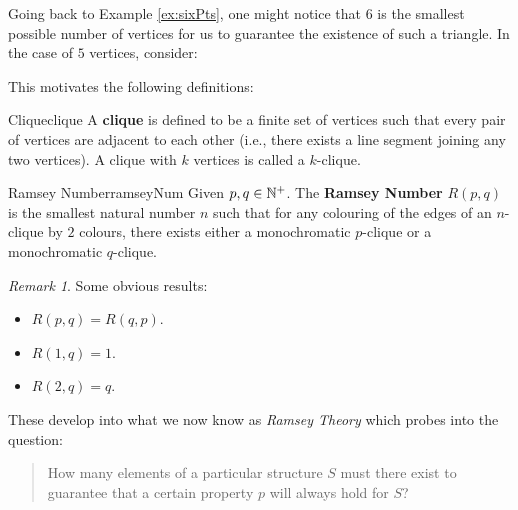 \documentclass[math]{amznotes}
\theoremstyle{remark}
\newtheorem*{remark}{Remark}
\begin{document}
Going back to Example \ref{ex:sixPts}, one might notice that $6$ is the smallest possible number of vertices for us to guarantee the existence of such a triangle. In the case of $5$ vertices, consider:
\begin{center}
\end{center}
This motivates the following definitions:
\begin{dfnbox}{Clique}{clique}
    A {\color{red} \textbf{clique}} is defined to be a finite set of vertices such that every pair of vertices are adjacent to each other (i.e., there exists a line segment joining any two vertices). A clique with $k$ vertices is called a $k$-clique.
\end{dfnbox}
\begin{dfnbox}{Ramsey Number}{ramseyNum}
    Given $p, q \in \mathbb{N}^+$. The {\color{red} \textbf{Ramsey Number}} $R(p, q)$ is the smallest natural number $n$ such that for any colouring of the edges of an $n$-clique by $2$ colours, there exists either a monochromatic $p$-clique or a monochromatic $q$-clique.
\end{dfnbox}
\begin{notebox}
    \begin{remark}
        Some obvious results:
        \begin{itemize}
            \item $R(p, q) = R(q, p)$.
            \item $R(1, q) = 1$.
            \item $R(2, q) = q$.
        \end{itemize}
    \end{remark}
\end{notebox}
These develop into what we now know as \textit{Ramsey Theory} which probes into the question:
\begin{quote}
    How many elements of a particular structure $S$ must there exist to guarantee that a certain property $p$ will always hold for $S$?
\end{quote}
\end{document}
